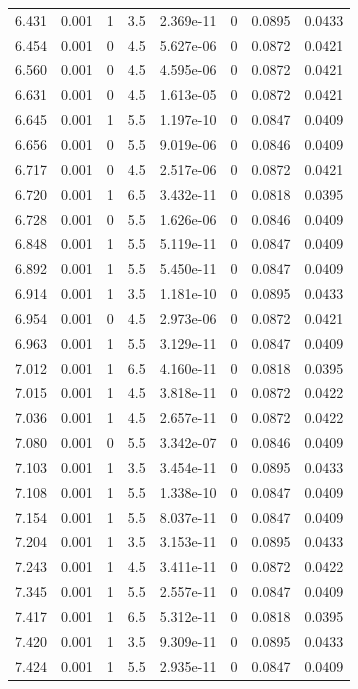 \documentclass[preview]{standalone}
\begin{document}
{{{\begin{tabular}{L{1.2cm}C{1.2cm} C{0.3cm}C{0.5cm} C{1.4cm}C{1.4cm} C{1.4cm}C{1.4cm}}
  6.431  &  0.001  & 1     & 3.5 &  2.369e-11  & 0  & 0.0895 &  0.0433   \\ 
  6.454  &  0.001  & 0     & 4.5 &  5.627e-06  & 0  & 0.0872 &  0.0421   \\ 
  6.560  &  0.001  & 0     & 4.5 &  4.595e-06  & 0  & 0.0872 &  0.0421   \\ 
  6.631  &  0.001  & 0     & 4.5 &  1.613e-05  & 0  & 0.0872 &  0.0421   \\ 
  6.645  &  0.001  & 1     & 5.5 &  1.197e-10  & 0  & 0.0847 &  0.0409   \\ 
  6.656  &  0.001  & 0     & 5.5 &  9.019e-06  & 0  & 0.0846 &  0.0409   \\ 
  6.717  &  0.001  & 0     & 4.5 &  2.517e-06  & 0  & 0.0872 &  0.0421   \\ 
  6.720  &  0.001  & 1     & 6.5 &  3.432e-11  & 0  & 0.0818 &  0.0395   \\ 
  6.728  &  0.001  & 0     & 5.5 &  1.626e-06  & 0  & 0.0846 &  0.0409   \\ 
  6.848  &  0.001  & 1     & 5.5 &  5.119e-11  & 0  & 0.0847 &  0.0409   \\ 
  6.892  &  0.001  & 1     & 5.5 &  5.450e-11  & 0  & 0.0847 &  0.0409   \\ 
  6.914  &  0.001  & 1     & 3.5 &  1.181e-10  & 0  & 0.0895 &  0.0433   \\ 
  6.954  &  0.001  & 0     & 4.5 &  2.973e-06  & 0  & 0.0872 &  0.0421   \\ 
  6.963  &  0.001  & 1     & 5.5 &  3.129e-11  & 0  & 0.0847 &  0.0409   \\ 
  7.012  &  0.001  & 1     & 6.5 &  4.160e-11  & 0  & 0.0818 &  0.0395   \\ 
  7.015  &  0.001  & 1     & 4.5 &  3.818e-11  & 0  & 0.0872 &  0.0422   \\ 
  7.036  &  0.001  & 1     & 4.5 &  2.657e-11  & 0  & 0.0872 &  0.0422   \\ 
  7.080  &  0.001  & 0     & 5.5 &  3.342e-07  & 0  & 0.0846 &  0.0409   \\ 
  7.103  &  0.001  & 1     & 3.5 &  3.454e-11  & 0  & 0.0895 &  0.0433   \\ 
  7.108  &  0.001  & 1     & 5.5 &  1.338e-10  & 0  & 0.0847 &  0.0409   \\ 
  7.154  &  0.001  & 1     & 5.5 &  8.037e-11  & 0  & 0.0847 &  0.0409   \\ 
  7.204  &  0.001  & 1     & 3.5 &  3.153e-11  & 0  & 0.0895 &  0.0433   \\ 
  7.243  &  0.001  & 1     & 4.5 &  3.411e-11  & 0  & 0.0872 &  0.0422   \\ 
  7.345  &  0.001  & 1     & 5.5 &  2.557e-11  & 0  & 0.0847 &  0.0409   \\ 
  7.417  &  0.001  & 1     & 6.5 &  5.312e-11  & 0  & 0.0818 &  0.0395   \\ 
  7.420  &  0.001  & 1     & 3.5 &  9.309e-11  & 0  & 0.0895 &  0.0433   \\ 
  7.424  &  0.001  & 1     & 5.5 &  2.935e-11  & 0  & 0.0847 &  0.0409   \\ 
\hline 
\end{tabular} 

}}}
\end{document}

